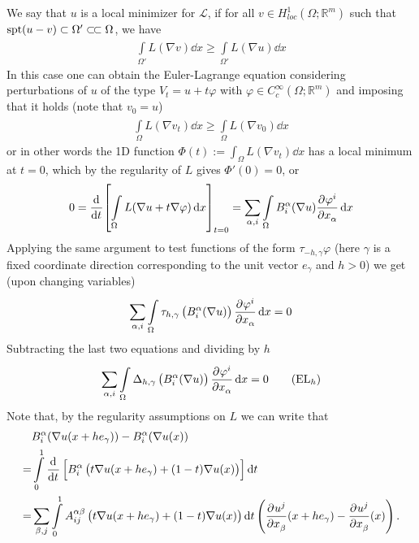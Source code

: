 We say that \( u \) is a local minimizer for \( \mathcal{L} \), if for all \( v \in  H_{loc}^{1}(\Omega ; \mathbb{R}^{m})  \) such that \( \operatorname{spt}(u-v) \subset \Omega' \ssubset \Omega  \), we have
\begin{gather}
	\int\limits_{\Omega'}^{} L(\nabla v)  \dd{x}	\geq \int\limits_{\Omega'}^{} L(\nabla u)  \dd{x}
\end{gather}
In this case one can obtain the Euler-Lagrange equation considering perturbations of \( u \) of the type \( V_{t}= u +t \varphi  \) with \(  \varphi \in C_{c}^{\infty }(\Omega ; \mathbb{R}^{m})  \) and imposing that it holds (note that \( v_{0}=u \))
\begin{gather}
	\int\limits_{\Omega}^{} L(\nabla v_{t})  \dd{x} \geq \int\limits_{\Omega}^{} L(\nabla v_{0})  \dd{x}
\end{gather}
or in other words the 1D function \( \Phi (t):= \int_{\Omega}^{} L(\nabla v_{t})  \dd{x}  \) has a local minimum at \( t=0 \), which by the regularity of \( L \) gives \( \Phi '(0)=0  \), or
\begin{gather}
	0 = \dv[]{}{t} {\left[ \int\limits_{\Omega}^{} L(\nabla u + t \nabla \varphi )  \dd{x} \right]}_{t=0} = \sum\limits_{\alpha , i}^{} \int\limits_{\Omega}^{} B_{i}^{\alpha }(\nabla u) \pdv[]{\varphi^{i}}{x_{\alpha }} \dd{x}
\end{gather}
Applying the same argument to test functions of the form \( \tau _{-h, \gamma }\varphi  \) (here \( \gamma  \) is a fixed coordinate direction corresponding to the unit vector \( e_{\gamma } \) and \( h>0 \)) we get (upon changing variables)
\begin{gather}
	\sum\limits_{\alpha , i}^{} \int\limits_{\Omega}^{} \tau _{h, \gamma } \left( B_{i}^{\alpha }(\nabla u) \right) \pdv[]{\varphi^{i}}{x_{\alpha }} \dd{x} = 0
\end{gather}
Subtracting the last two equations and dividing by \( h \)
\begin{gather}
	\sum\limits_{\alpha , i}^{} \int\limits_{\Omega}^{} \Delta _{h, \gamma } \left( B_{i}^{\alpha }(\nabla u)  \right) \pdv[]{\varphi ^{i}}{x_{\alpha }} \dd{x}	=0   \tag{EL\(_{h} \)}\label{ELh}
\end{gather}
Note that, by the regularity assumptions on \( L \) we can write that
\begin{align}
	  & B_{i}^{\alpha } (\nabla u(x+h e_{\gamma }) ) -  B_{i}^{\alpha } (\nabla u(x) )  \\
	= & \int\limits_{0}^{1} \dv[]{}{t} \left[ B_{i}^{\alpha } \left( t\nabla u(x+h e_{\gamma }) +(1-t) \nabla u(x) \right)  \right] \dd{t}  \\
	= & \sum\limits_{\beta , j}^{} \int\limits_{0}^{1} A_{ij}^{\alpha \beta } \left( t\nabla u(x+h e_{\gamma }) +(1-t) \nabla u(x) \right) \dd{t} \left( \pdv[]{u^{j}}{x_{\beta }}\/(x+h e_{\gamma }) - \pdv[]{u^{j}}{x_{\beta }}\/(x)  \right).
\end{align}
